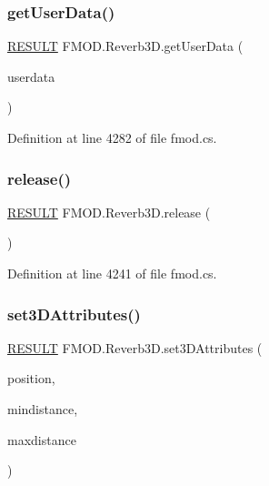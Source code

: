 \subsubsection{\texorpdfstring{get\+User\+Data()}{getUserData()}}
{\footnotesize\ttfamily \hyperlink{namespace_f_m_o_d_a305d1176ef3f8c8815861a60407ac33d}{R\+E\+S\+U\+LT} F\+M\+O\+D.\+Reverb3\+D.\+get\+User\+Data (\begin{DoxyParamCaption}\item[{out Int\+Ptr}]{userdata }\end{DoxyParamCaption})}



Definition at line 4282 of file fmod.\+cs.

\mbox{\label{class_f_m_o_d_1_1_reverb3_d_a7f8fc7adb28c09c2d36cfc725c9f3110}} 
\subsubsection{\texorpdfstring{release()}{release()}}
{\footnotesize\ttfamily \hyperlink{namespace_f_m_o_d_a305d1176ef3f8c8815861a60407ac33d}{R\+E\+S\+U\+LT} F\+M\+O\+D.\+Reverb3\+D.\+release (\begin{DoxyParamCaption}{ }\end{DoxyParamCaption})}



Definition at line 4241 of file fmod.\+cs.

\mbox{\label{class_f_m_o_d_1_1_reverb3_d_adaf18959a4a422eaa5fb73bd9b0a895e}} 
\subsubsection{\texorpdfstring{set3\+D\+Attributes()}{set3DAttributes()}}
{\footnotesize\ttfamily \hyperlink{namespace_f_m_o_d_a305d1176ef3f8c8815861a60407ac33d}{R\+E\+S\+U\+LT} F\+M\+O\+D.\+Reverb3\+D.\+set3\+D\+Attributes (\begin{DoxyParamCaption}\item[{ref \hyperlink{struct_f_m_o_d_1_1_v_e_c_t_o_r}{V\+E\+C\+T\+OR}}]{position,  }\item[{float}]{mindistance,  }\item[{float}]{maxdistance }\end{DoxyParamCaption})}



